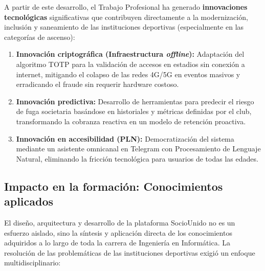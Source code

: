 \documentclass[conference, a4paper]{IEEEtran}
\begin{document}
A partir de este desarrollo, el Trabajo Profesional ha generado \textbf{innovaciones tecnol\'ogicas} significativas que contribuyen directamente a la modernizaci\'on, inclusi\'on y saneamiento de las instituciones deportivas (especialmente en las categor\'ias de ascenso):
\begin{enumerate}
    \item \textbf{Innovaci\'on criptogr\'afica (Infraestructura \textit{offline}):} Adaptaci\'on del algoritmo TOTP para la validaci\'on de accesos en estadios sin conexi\'on a internet, mitigando el colapso de las redes 4G/5G en eventos masivos y erradicando el fraude sin requerir hardware costoso.
    \item \textbf{Innovaci\'on predictiva:} Desarrollo de herramientas para predecir el riesgo de fuga societaria bas\'andose en historiales y m\'etricas definidas por el club, transformando la cobranza reactiva en un modelo de retenci\'on proactiva.
    \item \textbf{Innovaci\'on en accesibilidad (PLN):} Democratizaci\'on del sistema mediante un asistente omnicanal en Telegram con Procesamiento de Lenguaje Natural, eliminando la fricci\'on tecnol\'ogica para usuarios de todas las edades.
\end{enumerate}

\subsection{Impacto en la formaci\'on: Conocimientos aplicados}
El dise\~no, arquitectura y desarrollo de la plataforma SocioUnido no es un esfuerzo aislado, sino la s\'intesis y aplicaci\'on directa de los conocimientos adquiridos a lo largo de toda la carrera de Ingenier\'ia en Inform\'atica. La resoluci\'on de las problem\'aticas de las instituciones deportivas exigi\'o un enfoque multidisciplinario:
\end{document}
